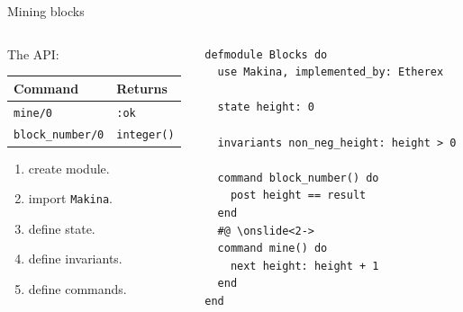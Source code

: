 \documentclass[aspectratio=169, 10pt, handout]{beamer}
\begin{document}
\begin{frame}[label={sec:org8dfff0c},fragile]{Mining blocks}
 \begin{columns}
\begin{column}{0.48\columnwidth}
The API:

\begin{center}
\begin{tabular}{ll}
Command & Returns\\
\hline
\texttt{mine/0} & \texttt{:ok}\\
\texttt{block\_number/0} & \texttt{integer()}\\
\end{tabular}
\end{center}

\vspace{10pt}
\begin{enumerate}
\item create module.
\item import \texttt{Makina}.
\item define state.
\item define invariants.
\item define commands.
\end{enumerate}
\end{column}

\begin{column}{0.48\columnwidth}
\lstset{language=elixir,label= ,caption= ,captionpos=b,numbers=none,style=display}
\begin{lstlisting}
defmodule Blocks do
  use Makina, implemented_by: Etherex

  state height: 0

  invariants non_neg_height: height > 0

  command block_number() do
    post height == result
  end
  #@ \onslide<2->
  command mine() do
    next height: height + 1
  end
end
\end{lstlisting}
\end{column}
\end{columns}
\end{frame}
\end{document}
